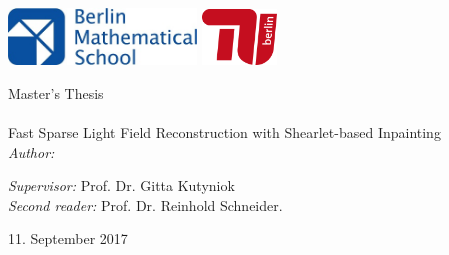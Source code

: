 \documentclass[11pt, english, singlespacing, headsepline, ]{MastersDoctoralThesis}
\author{Héctor Andrade Loarca} %
\theoremstyle{definition}
\begin{document}
\frontmatter %

\pagestyle{plain} %


\begin{titlepage}
\centering\includegraphics*[width=5cm]{bms-logo.jpg} \vspace{50pt}\includegraphics*[width=2cm]{tu-logo.jpg} \\

\begin{center}

{\LARGE \univname\par}\vspace{1.5cm} %
\Large Master's Thesis\\[0.5cm] %

\HRule \\[0.4cm] %
\huge
Fast Sparse Light Field Reconstruction with Shearlet-based Inpainting
\vspace{0.4cm} %
\HRule \\[1.5cm] %
 \normalsize
\emph{Author:}\\
{\authorname} %


\vspace{4cm}

\begin{flushleft} 
\emph{Supervisor:} Prof. Dr. Gitta Kutyniok\\
\emph{Second reader:} Prof. Dr. Reinhold Schneider.\\
\end{flushleft} 


\vspace{1cm}
 \facname

{\large 11. September 2017}\\[4cm] %
 
\vfill
\end{center}
\end{titlepage}
\end{document}
